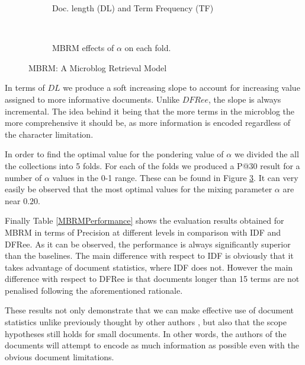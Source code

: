 \begin{figure}
	\begin{subfigure}[]{0.5\textwidth}
		\caption{Doc. length (DL) and Term Frequency (TF)}
		
		\label{microblogRM}
	\end{subfigure} 
	~
	\begin{subfigure}[]{0.5\textwidth}
		\vspace{-0.7cm}
		\caption{MBRM effects of $\alpha$ on each fold.}
		
		\label{microblogRM-param}
	\end{subfigure} 
	\caption{MBRM: A Microblog Retrieval Model}
\end{figure} 

In terms of $DL$ we produce a soft increasing slope to account for increasing value assigned to more informative documents. Unlike $DFRee$, the slope is always incremental. The idea behind it being that the more terms in the microblog the more comprehensive it should be, as more information is encoded regardless of the character limitation.

In order to find the optimal value for the pondering value of $\alpha$ we divided the all the collections into 5 folds. For each of the folds we produced a P@30 result for a number of $\alpha$ values in the 0-1 range. These can be found in Figure \ref{microblogRM-param}. It can very easily be observed that the most optimal values for the mixing parameter $\alpha$ are near $0.20$.

Finally Table \ref{MBRMPerformance} shows the evaluation results obtained for MBRM in terms of Precision at different levels in comparison with IDF and DFRee. As it can be observed, the performance is always significantly superior than the baselines. The main difference with respect to IDF is obviously that it takes advantage of document statistics, where IDF does not. However the main difference with respect to DFRee is that documents longer than 15 terms are not penalised following the aforementioned rationale. 

These results not only demonstrate that we can make effective use of document statistics unlike previously thought by other authors \cite{naveed2011searching}, but also that the scope hypotheses still holds for small documents. In other words, the authors of the documents will attempt to encode as much information as possible even with the obvious document limitations. 


